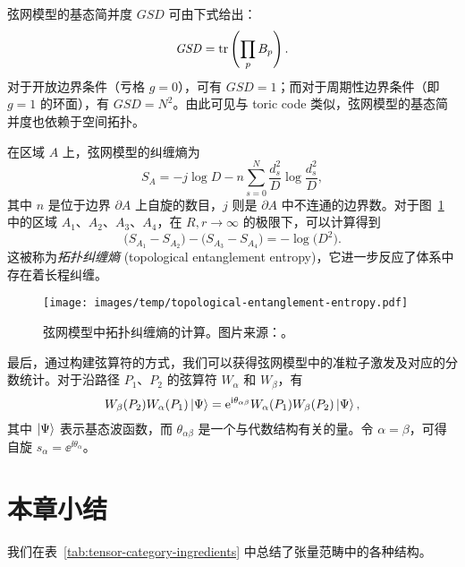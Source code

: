 弦网模型的基态简并度 $\mathit{GSD}$ 可由下式给出\cite{levin2011exactly,hu2012ground}：
\begin{equation}
  \mathit{GSD} = \operatorname{tr}\left( \prod_p B_p \right).
\end{equation}
对于开放边界条件（亏格 $g=0$），可有 $\mathit{GSD}=1$；而对于周期性边界条件（即 $g=1$ 的环面），有 $\mathit{GSD}=N^2$。由此可见与 toric code 类似，弦网模型的基态简并度也依赖于空间拓扑。

在区域 $A$ 上，弦网模型的纠缠熵为\cite{levin2006detecting}
\begin{equation}
  S_A = -j \log D - n \sum_{s=0}^N \frac{d_s^2}{D} \log \frac{d_s^2}{D},
\end{equation}
其中 $n$ 是位于边界 $\partial A$ 上自旋的数目，$j$ 则是 $\partial A$ 中不连通的边界数。对于图~\ref{fig:topological-entanglement-entropy} 中的区域 $A_1$、$A_2$、$A_3$、$A_4$，在 $R,r\to\infty$ 的极限下，可以计算得到
\begin{equation}
  \bigl( S_{A_1} - S_{A_2} \bigr) - \bigl( S_{A_3} - S_{A_4} \bigr) = -\log \bigl( D^2 \bigr).
\end{equation}
这被称为\emph{拓扑纠缠熵} (topological entanglement entropy)，它进一步反应了体系中存在着长程纠缠。

\begin{figure}[htb]
  \centering
  \texttt{[image: images/temp/topological-entanglement-entropy.pdf]}
  \caption[弦网模型中拓扑纠缠熵的计算]{弦网模型中拓扑纠缠熵的计算。图片来源：\parencite{levin2006detecting}。}
  \label{fig:topological-entanglement-entropy}
\end{figure}

最后，通过构建弦算符的方式，我们可以获得弦网模型中的准粒子激发及对应的分数统计\cite{levin2005string,lin2014generalizations}。对于沿路径 $P_1$、$P_2$ 的弦算符 $W_\alpha$ 和 $W_\beta$，有
\begin{equation}
  W_\beta(P_2) W_\alpha(P_1) \ket{\Psi} = \ee^{\ii\theta_{\alpha\beta}} W_\alpha(P_1) W_\beta(P_2) \ket{\Psi},
\end{equation}
其中 $\ket{\Psi}$ 表示基态波函数，而 $\theta_{\alpha\beta}$ 是一个与代数结构有关的量。令 $\alpha=\beta$，可得自旋 $s_\alpha=\ee^{\ii\theta_\alpha}$。

\section{本章小结}

我们在表~\ref{tab:tensor-category-ingredients} 中总结了张量范畴中的各种结构。

